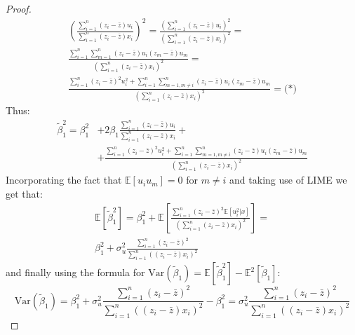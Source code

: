\documentclass[12pt,reqno]{amsart}
\theoremstyle{plain}
\newcommand{\E}{\mathbb{E}}
\newcommand{\tb}{\tilde\beta}
\begin{document}
\begin{proof}
    \begin{gather*}
        \left(\frac{\sum_{i=1}^{n} (z_{i} - \bar{z})u_{i}}{\sum_{i=1}^{n} (z_{i} - \bar{z})x_{i}} \right)^{2} =
        \frac{\left(\sum_{i=1}^{n} (z_{i} - \bar{z})u_{i}\right)^{2}}{\left(\sum_{i=1}^{n} (z_{i} - \bar{z})x_{i}\right)^{2}} =\\
        \frac{
        \sum_{i=1}^{n} \sum_{m=1}^{n} (z_{i} - \bar{z})u_{i}(z_{m} - \bar{z})u_{m}
        }{\left(\sum_{i=1}^{n} (z_{i} - \bar{z})x_{i}\right)^{2}} = \\
        \frac{
        \sum_{i=1}^{n} (z_{i} - \bar{z})^{2}u_{i}^{2} + \sum_{i=1}^{n} \sum_{m=1, m\ne i}^{n} (z_{i} - \bar{z})u_{i}(z_{m} - \bar{z})u_{m}
        }{\left(\sum_{i=1}^{n} (z_{i} - \bar{z})x_{i}\right)^{2}} = \textbf{(*)}
    \end{gather*}
    Thus:
    \begin{align*}
        \tb_1^{2} = \beta_{1}^{2} & + 2\beta_{1}\frac{\sum_{i=1}^{n} (z_{i} - \bar{z})u_{i}}{\sum_{i=1}^{n} (z_{i} - \bar{z})x_{i}} + \\
                                  & +\frac{
        \sum_{i=1}^{n} (z_{i} - \bar{z})^{2}u_{i}^{2} + \sum_{i=1}^{n} \sum_{m=1, m\ne i}^{n} (z_{i} - \bar{z})u_{i}(z_{m} - \bar{z})u_{m}
        }{\left(\sum_{i=1}^{n} (z_{i} - \bar{z})x_{i}\right)^{2}}
    \end{align*}
    Incorporating the fact that $ \E\left[ u_i u_m \right] = 0 $ for $ m\ne i $ and taking use of LIME
    we get that:
    \begin{gather*}
        \E \left[ \tb_1^{2} \right] = \beta_{1}^{2} +
        \E \left[
            \frac{
                \sum_{i=1}^{n} (z_{i} - \bar{z})^{2}\E \left[   u_{i}^{2} | x\right]
            }{\left(\sum_{i=1}^{n} (z_{i} - \bar{z})x_{i}\right)^{2}} \right] = \\
        \beta_{1}^{2} + \sigma^{2}_{u} \frac{\sum_{i=1}^{n} (z_i - \bar{z})^{2}}{\sum_{i=1}^{n} ((z_i - \bar{z})x_i)^{2}}
    \end{gather*}
    and finally using the formula for $ \text{Var}(\tilde\beta_{1}) = \E[\tilde\beta_{1}^{2}] - \E^{2}[\tilde\beta_{1}] $:
    \[
        \text{Var}(\tb_{1}) = \beta_{1}^{2} + \sigma^{2}_{u} \frac{\sum_{i=1}^{n} (z_i - \bar{z})^{2}}{\sum_{i=1}^{n} ((z_i - \bar{z})x_i)^{2}}
        - \beta_1^{2} =\sigma^{2}_{u} \frac{\sum_{i=1}^{n} (z_i - \bar{z})^{2}}{\sum_{i=1}^{n} ((z_i - \bar{z})x_i)^{2}}
    \]
\end{proof}
\end{document}
